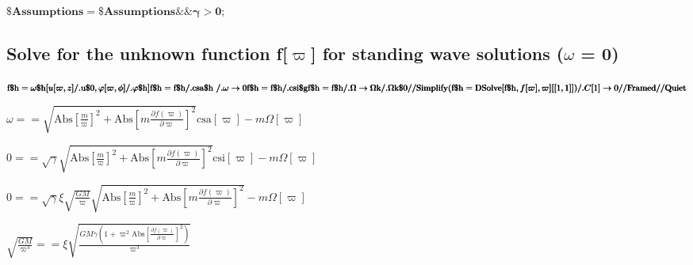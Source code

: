 \documentclass{article}
\begin{document}
\begin{doublespace}
\noindent\(\pmb{\text{$\$$Assumptions} = \text{$\$$Assumptions} \&\& \gamma  > 0;}\)
\end{doublespace}

\subsection*{Solve for the unknown function f[$\varpi $] for standing wave solutions ($\omega $ = 0)}

\begin{doublespace}
\noindent\(\pmb{\text{f$\$$h} = \text{$\omega \$$h}[u[\varpi ,z]\text{/.} \text{u$\$$0}, \varphi [\varpi ,\phi ] \text{/.}\text{$\varphi \$$h} ]}\\
\pmb{\text{f$\$$h} = \text{f$\$$h}\text{/.} \text{csa$\$$h}\text{  }\text{/.} \omega \to  0}\\
\pmb{\text{f$\$$h} = \text{f$\$$h} \text{/.} \text{csi$\$$g}}\\
\pmb{\text{f$\$$h} = \text{f$\$$h} \text{/.} \Omega \to  \text{$\Omega $k} \text{/.} \text{$\Omega $k$\$$0} \text{//}\text{Simplify}}\\
\pmb{(\text{f$\$$h} = \text{DSolve}[\text{f$\$$h},f[\varpi ],\varpi ][[1,1]]) \text{/.} C[1]\to  0 \text{//}\text{Framed} \text{//}\text{Quiet}}\)
\end{doublespace}

\begin{doublespace}
\noindent\(\omega ==\sqrt{\text{Abs}\left[\frac{m}{\varpi }\right]^2+\text{Abs}\left[m \frac{\partial f(\varpi )}{\partial \varpi }\right]^2} \text{csa}[\varpi
]-m \Omega [\varpi ]\)
\end{doublespace}

\begin{doublespace}
\noindent\(0==\sqrt{\gamma } \sqrt{\text{Abs}\left[\frac{m}{\varpi }\right]^2+\text{Abs}\left[m \frac{\partial f(\varpi )}{\partial \varpi }\right]^2}
\text{csi}[\varpi ]-m \Omega [\varpi ]\)
\end{doublespace}

\begin{doublespace}
\noindent\(0==\sqrt{\gamma } \xi  \sqrt{\frac{G M}{\varpi }} \sqrt{\text{Abs}\left[\frac{m}{\varpi }\right]^2+\text{Abs}\left[m \frac{\partial f(\varpi
)}{\partial \varpi }\right]^2}-m \Omega [\varpi ]\)
\end{doublespace}

\begin{doublespace}
\noindent\(\sqrt{\frac{G M}{\varpi ^3}}==\xi  \sqrt{\frac{G M \gamma  \left(1+\varpi ^2 \text{Abs}\left[\frac{\partial f(\varpi )}{\partial \varpi
}\right]^2\right)}{\varpi ^3}}\)
\end{doublespace}
\end{document}
